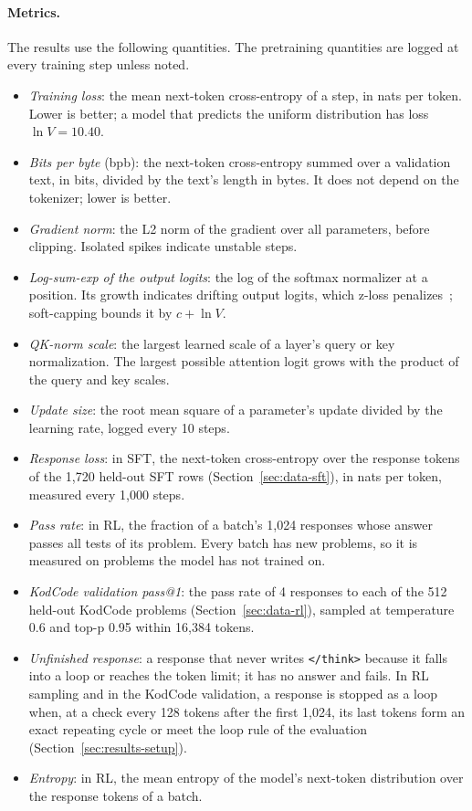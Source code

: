 \documentclass[sigconf,nonacm,balance=false]{acmart}
\begin{document}
\paragraph{Metrics.} The results use the following quantities. The pretraining quantities are logged at every training
step unless noted.
\begin{itemize}
  \item \emph{Training loss}: the mean next-token cross-entropy of a step, in nats per token. Lower is better; a model
  that predicts the uniform distribution has loss $\ln V = 10.40$.
  \item \emph{Bits per byte} (bpb): the next-token cross-entropy summed over a validation text, in bits, divided by
  the text's length in bytes. It does not depend on the tokenizer; lower is better.
  \item \emph{Gradient norm}: the L2 norm of the gradient over all parameters, before clipping. Isolated spikes
  indicate unstable steps.
  \item \emph{Log-sum-exp of the output logits}: the log of the softmax normalizer at a position. Its growth indicates
  drifting output logits, which z-loss penalizes~\cite{wortsman2023smallscale}; soft-capping bounds it by $c + \ln V$.
  \item \emph{QK-norm scale}: the largest learned scale of a layer's query or key normalization. The largest possible
  attention logit grows with the product of the query and key scales.
  \item \emph{Update size}: the root mean square of a parameter's update divided by the learning rate, logged every
  10 steps.
  \item \emph{Response loss}: in SFT, the next-token cross-entropy over the response tokens of the 1,720 held-out SFT
  rows (Section~\ref{sec:data-sft}), in nats per token, measured every 1,000 steps.
  \item \emph{Pass rate}: in RL, the fraction of a batch's 1,024 responses whose answer passes all tests of its
  problem. Every batch has new problems, so it is measured on problems the model has not trained on.
  \item \emph{KodCode validation pass@1}: the pass rate of 4 responses to each of the 512 held-out KodCode problems
  (Section~\ref{sec:data-rl}), sampled at temperature 0.6 and top-p 0.95 within 16,384 tokens.
  \item \emph{Unfinished response}: a response that never writes \texttt{</think>} because it falls into a loop or
  reaches the token limit; it has no answer and fails. In RL sampling and in the KodCode validation, a response is
  stopped as a loop when, at a check every 128 tokens after the first 1,024, its last tokens form an exact repeating
  cycle or meet the loop rule of the evaluation (Section~\ref{sec:results-setup}).
  \item \emph{Entropy}: in RL, the mean entropy of the model's next-token distribution over the response tokens of a
  batch.
\end{itemize}
\end{document}
